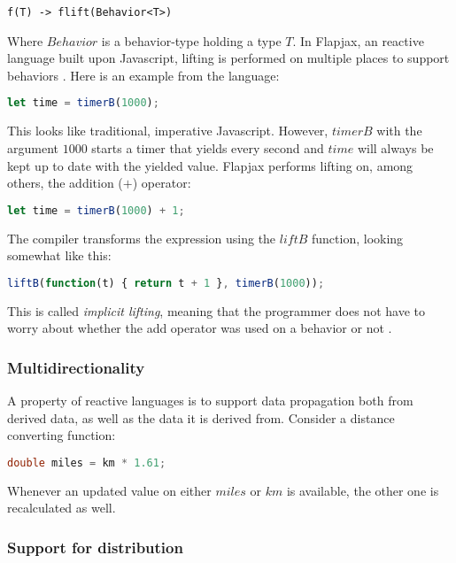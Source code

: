 \begin{lstlisting}
f(T) -> flift(Behavior<T>)
\end{lstlisting}

Where $Behavior$ is a behavior-type holding a type $T$. In Flapjax, an reactive
language built upon Javascript, lifting is performed on multiple places to
support behaviors \cite{meyerovich2009flapjax}. Here is an example from the
language:

\begin{lstlisting}[language=javascript]
let time = timerB(1000);
\end{lstlisting}

This looks like traditional, imperative Javascript. However, $timerB$ with the
argument $1000$ starts a timer that yields every second and $time$ will always
be kept up to date with the yielded value. Flapjax performs lifting on, among
others, the addition ($+$) operator:


\begin{lstlisting}[language=javascript]
let time = timerB(1000) + 1;
\end{lstlisting}

The compiler transforms the expression using the $liftB$ function, looking
somewhat like this:

\begin{lstlisting}[language=javascript]
liftB(function(t) { return t + 1 }, timerB(1000));
\end{lstlisting}

This is called \textit{implicit lifting}, meaning that the programmer does not
have to worry about whether the add operator was used on a behavior or not
\cite{bainomugisha2013survey}.

\subsubsection{Multidirectionality}

A property of reactive languages is to support data propagation both from
derived data, as well as the data it is derived from. Consider a distance
converting function:

\begin{lstlisting}[language=C]
double miles = km * 1.61;
\end{lstlisting}

Whenever an updated value on either $miles$ or $km$ is available, the other one
is recalculated as well.

\subsubsection{Support for distribution}

